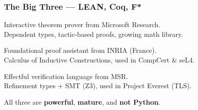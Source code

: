 \begin{frame}
\frametitle{The Big Three --- LEAN, Coq, F*}
\begin{description}
  \item[\textbf{LEAN\,4}] Interactive theorem prover from \textcolor{jugeoBlue}{Microsoft Research}.\\
    Dependent types, tactic-based proofs, growing math library.
  \item[\textbf{Coq}] Foundational proof assistant from \textcolor{jugeoBlue}{INRIA} (France).\\
    Calculus of Inductive Constructions, used in CompCert \& seL4.
  \item[\textbf{F*}] Effectful verification language from \textcolor{jugeoBlue}{MSR}.\\
    Refinement types + SMT (Z3), used in Project Everest (TLS).
\end{description}
\vfill
\begin{center}
  \small All three are \textbf{powerful}, \textbf{mature}, and \textbf{not Python}.
\end{center}
\end{frame}

